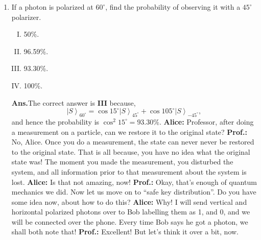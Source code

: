 \documentclass[12pt]{article}
\newcommand\rr{\right \rangle}
\newcommand\ls{\left |}
\newcommand\tbf[1]{\textbf{#1}}
\newcommand\ta{\tbf{Alice: }}
\newcommand\tp{\tbf{Prof.: }}
\newcommand\tans{\tbf{Ans.}}
\begin{document}
\begin{enumerate}[1.]
\tp It is interesting to see the difference between the classical ``Mallus' Law'' with this. Here we are considering only one photon, and unless we do a measurement we are not sure if the photon has passed through a certain polarizer, whereas for ``Mallus' Law'', there was only a beam of photons and there was no uncertainty. The average intensity was given by $I_0 \cos^2{\theta}$, where $\theta$ is the angle between the polarizing axis of the polarizer and the polarization vector of the electromagnetic wave. The uncertainty thus translates into the so called ``expectation value''. \newline
\ta I undertand. \newline
\item If a photon is polarized at $60^\circ$, find the probability of observing it with a $45^\circ$ polarizer.
\begin{enumerate}[I.]
\item 50\%.
\item 96.59\%.
\item 93.30\%.
\item 100\%. \newline
\end{enumerate}
\tans The correct answer is \tbf{III} because,
$$
\ls S \rr _{60^\circ} = \cos{15^\circ} \ls S \rr _{45^\circ}+\cos{105^\circ} \ls S \rr _{-45^\circ},
$$
and hence the probability is $\cos^2{15^\circ} = 93.30 \%$. \newline
\ta Professor, after doing a measurement on a particle, can we restore it to the original state? \newline
\tp No, Alice. Once you do a measurement, the state can never never be restored to the original state. That is all because, you have no idea what the original state was! The moment you made the measurement, you disturbed the system, and all information prior to that measurement about the system is lost. \newline
\ta Is that not amazing, now! \newline
\tp Okay, that's enough of quantum mechanics we did. Now let us move on to ``safe key distribution''. Do you have some idea now, about how to do this? \newline
\ta Why! I will send vertical and horizontal polarized photons over to Bob labelling them as 1, and 0, and we will be connected over the phone. Every time Bob says he got a photon, we shall both note that! \newline
\tp Excellent! But let's think it over a bit, now. \newline

\end{enumerate}
\end{document}
